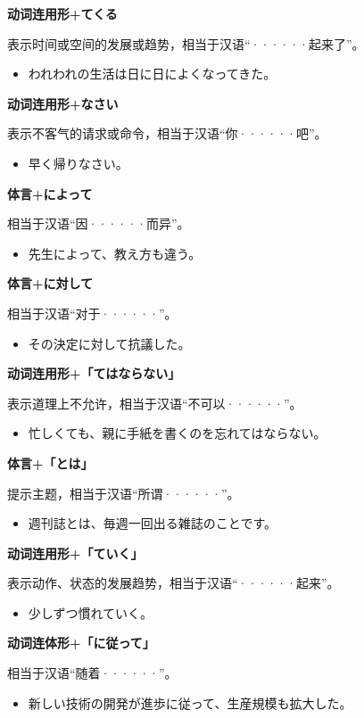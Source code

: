 {\bf
\noindent 动词连用形+てくる
}

表示时间或空间的发展或趋势，相当于汉语``······起来了''。
\begin{itemize}
  \item われわれの生活は日に日によくなってきた。
\end{itemize}

{\bf
\noindent 动词连用形+なさい
}

表示不客气的请求或命令，相当于汉语``你······吧''。
\begin{itemize}
  \item 早く帰りなさい。
\end{itemize}

{\bf
\noindent 体言+によって
}

相当于汉语``因······而异''。
\begin{itemize}
  \item 先生によって、教え方も違う。
\end{itemize}

{\bf
\noindent 体言+に対して
}

相当于汉语``对于······''。
\begin{itemize}
  \item その決定に対して抗議した。
\end{itemize}

{\bf
\noindent 动词连用形+「てはならない」
}

表示道理上不允许，相当于汉语``不可以······''。
\begin{itemize}
  \item 忙しくても、親に手紙を書くのを忘れてはならない。
\end{itemize}

{\bf
\noindent 体言+「とは」
}

提示主题，相当于汉语``所谓······''。
\begin{itemize}
  \item 週刊誌とは、毎週一回出る雑誌のことです。
\end{itemize}

{\bf
\noindent 动词连用形+「ていく」
}

表示动作、状态的发展趋势，相当于汉语``······起来''。
\begin{itemize}
  \item 少しずつ慣れていく。
\end{itemize}

{\bf
\noindent 动词连体形+「に従って」
}

相当于汉语``随着······''。
\begin{itemize}
  \item 新しい技術の開発が進歩に従って、生産規模も拡大した。
\end{itemize}

